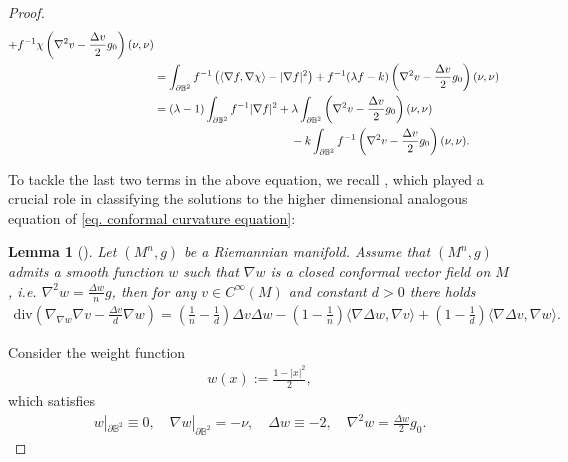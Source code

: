 \documentclass[11pt,a4paper,twoside]{amsart}
\newtheorem{lemma}[theorem]{Lemma}
\newtheorem{sketch proof}{Sketch of the proof}[section]
\begin{document}
\begin{proof}
\begin{align}
    +f^{-1}\chi
    \left(
    \nabla^2 v-\frac{\Delta v}{2}g_0
    \right)(\nu,\nu)\notag
    \\
    &= \int_{\partial\mathbb{B}^2}
    f^{-1}\left(\langle\nabla f,\nabla \chi\rangle-|\nabla f|^2\right)
    +f^{-1}(\lambda f-k)
    \left(
    \nabla^2 v-\frac{\Delta v}{2}g_0
    \right)(\nu,\nu)\notag\\
    &= (\lambda-1)\int_{\partial\mathbb{B}^2}
    f^{-1}|\nabla f|^2
    +\lambda\int_{\partial\mathbb{B}^2}
    \left(
    \nabla^2 v-\frac{\Delta v}{2}g_0
    \right)(\nu,\nu)\notag\\
    &
    \hspace{4.2cm}-k\int_{\partial\mathbb{B}^2}
    f^{-1}\left(
    \nabla^2 v-\frac{\Delta v}{2}g_0
    \right)(\nu,\nu).\label{eq. integral of Delta P}
\end{align}

To tackle the last two terms in the above equation, we recall  \cite[Lemma 3.2]{Cai26}, which played a crucial role in classifying the solutions to the higher dimensional analogous equation of \cref{eq. conformal curvature equation}:
\begin{lemma}[\cite{Cai26}]\label{lem. Cai26}
    Let $(M^n,g)$ be a Riemannian manifold. Assume  that $(M^n,g)$ admits a smooth function $w$ such that $\nabla w$ is a closed conformal vector field on $M$, i.e. $\nabla ^2 w=\frac{\Delta w}{n}g$, then for any $v\in C^{\infty}(M)$ and constant $d>0$ there holds
    \begin{align*}
        \mathrm{div}\left(\nabla_{\nabla w}\nabla v-\frac{\Delta v}{d}\nabla w\right)
        =\left(\frac{1}{n}-\frac{1}{d}\right)\Delta v\Delta w
        -\left(1-\frac{1}{n}\right)\langle\nabla \Delta w,\nabla v\rangle
        +\left(1-\frac{1}{d}\right)\langle\nabla \Delta v,\nabla w\rangle.
    \end{align*}
\end{lemma}
\vspace{0.2 cm}
Consider the weight function
    \begin{align*}
        w(x):=\frac{1-|x|^2}{2},
    \end{align*}
    which satisfies
    \begin{align*}
        w|_{\partial \mathbb{B}^2}\equiv 0,\quad 
        \nabla w|_{\partial \mathbb{B}^2}
        =-\nu,\quad 
        \Delta w\equiv-2,\quad
        \nabla^2 w=\frac{\Delta w}{2}g_0.
    \end{align*}


\end{proof}
\end{document}
